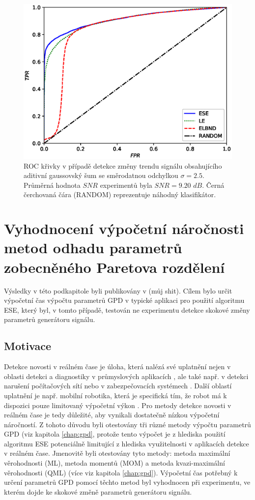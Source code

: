\begin{figure}[ht!]
    \centering
    \includegraphics[scale=0.73]{IMG/appel_roc/roc_25.eps}
    \caption{ROC křivky v případě detekce změny trendu signálu obsahujícího aditivní gaussovský šum se směrodatnou odchylkou $\sigma=2.5$. Průměrná hodnota $SNR$ experimentů byla $SNR=9.20$ $dB$. Černá čerchovaná čára (RANDOM) reprezentuje náhodný klasifikátor.}
    \label{fig:roc_25}
\end{figure}

\section{Vyhodnocení výpočetní náročnosti metod odhadu parametrů zobecněného Paretova rozdělení}
Výsledky v této podkapitole byli publikovány v (můj shit). Cílem bylo určit výpočetní čas výpočtu parametrů GPD v typické aplikaci pro použití algoritmu ESE, který byl, v tomto případě, testován ne experimentu detekce skokové změny parametrů generátoru signálu.
\subsection{Motivace}
Detekce novosti v reálném čase je úloha, která nalézá své uplatnění nejen v oblasti detekci a diagnostiky v průmyslových aplikacích \cite{fault}, ale také např. v detekci narušení počítačových sítí \cite{data_streams} nebo v zabezpečovacích systémech \cite{surveilance}. Další oblastí uplatnění je např. mobilní robotika, která je specifická tím, že robot má k dispozici pouze limitovaný výpočetní výkon \cite{robotics_marslan,robotics}. Pro metody detekce novosti v reálném čase je tedy důležité, aby vynikali dostatečně nízkou výpočetní náročností. Z tohoto důvodu byli otestovány tři různé metody výpočtu parametrů GPD (viz kapitola \ref{chap:gpd}, protože tento výpočet je z hlediska použití algoritmu ESE potenciálně limitující z hlediska využitelnosti v aplikacích detekce v reálném čase. Jmenovitě byli otestovány tyto metody: metoda maximální věrohodnosti (ML), metoda momentů (MOM) a metoda kvazi-maximální věrohodnosti (QML) (více viz kapitola \ref{chap:gpd}). Výpočetní čas potřebný k určení parametrů GPD pomocí těchto metod byl vyhodnocen při experimentu, ve kterém dojde ke skokové změně parametrů generátoru signálu.
